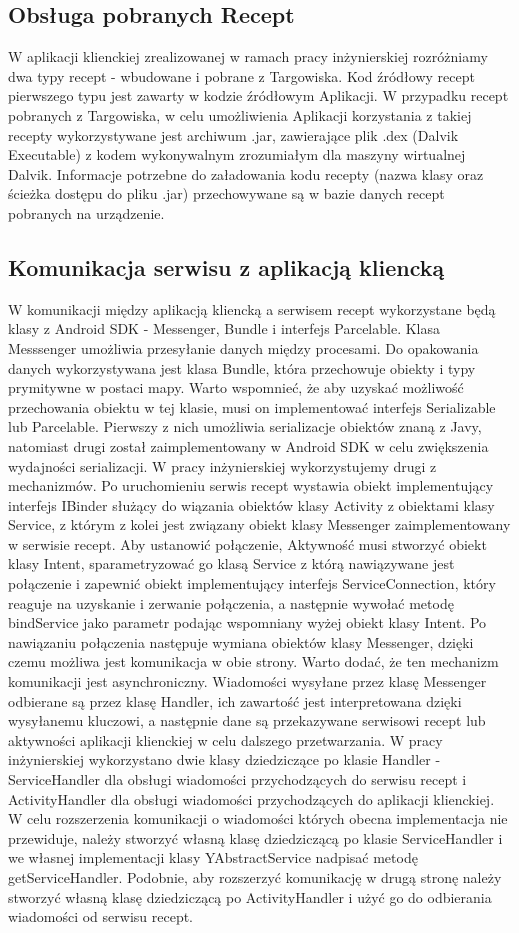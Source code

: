 \documentclass[11pt,a4paper,polish,thesis]{dcsbook}
\begin{document}
\subsection {Obsługa pobranych Recept}
W aplikacji klienckiej zrealizowanej w ramach pracy inżynierskiej rozróżniamy dwa typy recept - wbudowane i pobrane z Targowiska. Kod źródłowy recept pierwszego typu jest zawarty w kodzie źródłowym Aplikacji. W przypadku recept pobranych z Targowiska, w celu umożliwienia Aplikacji korzystania z takiej recepty wykorzystywane jest archiwum .jar, zawierające plik .dex (Dalvik Executable) z kodem wykonywalnym  zrozumiałym dla maszyny wirtualnej Dalvik. Informacje potrzebne do załadowania kodu recepty (nazwa klasy oraz ścieżka dostępu do pliku .jar) przechowywane są w bazie danych recept pobranych na urządzenie. 
\subsection{Komunikacja serwisu z aplikacją kliencką}
W komunikacji między aplikacją kliencką a serwisem recept wykorzystane będą klasy z Android SDK - Messenger, Bundle i interfejs Parcelable. Klasa Messsenger umożliwia przesyłanie danych między procesami. \cite{android.mesage} Do opakowania danych wykorzystywana jest klasa Bundle, która przechowuje obiekty i typy prymitywne w postaci mapy. Warto wspomnieć, że aby uzyskać możliwość przechowania obiektu w tej klasie, musi on implementować interfejs Serializable lub Parcelable. Pierwszy z nich umożliwia serializacje obiektów znaną z Javy, natomiast drugi został zaimplementowany w Android SDK w celu zwiększenia wydajności serializacji. W pracy inżynierskiej wykorzystujemy drugi z mechanizmów. Po uruchomieniu serwis recept wystawia obiekt implementujący interfejs IBinder służący do wiązania obiektów klasy Activity z obiektami klasy Service,  z którym z kolei jest związany obiekt klasy Messenger zaimplementowany w serwisie recept. Aby ustanowić połączenie, Aktywność musi stworzyć obiekt klasy Intent, sparametryzować go klasą Service z którą nawiązywane jest połączenie i zapewnić obiekt implementujący interfejs ServiceConnection, który reaguje na uzyskanie i zerwanie połączenia, a następnie wywołać metodę bindService jako parametr podając wspomniany wyżej obiekt klasy Intent. Po nawiązaniu połączenia następuje wymiana obiektów klasy Messenger, dzięki czemu możliwa jest komunikacja w obie strony. Warto dodać, że ten mechanizm komunikacji jest asynchroniczny. Wiadomości wysyłane przez klasę Messenger odbierane są przez klasę Handler, ich zawartość jest interpretowana dzięki wysyłanemu kluczowi, a następnie dane są przekazywane serwisowi recept lub aktywności aplikacji klienckiej w celu dalszego przetwarzania. W pracy inżynierskiej wykorzystano dwie klasy dziedziczące po klasie Handler - ServiceHandler dla obsługi wiadomości przychodzących do serwisu recept i ActivityHandler dla obsługi wiadomości przychodzących do aplikacji klienckiej. W celu rozszerzenia komunikacji o wiadomości których obecna implementacja nie przewiduje, należy stworzyć własną klasę dziedziczącą po klasie ServiceHandler i we własnej implementacji klasy YAbstractService nadpisać metodę getServiceHandler. Podobnie, aby rozszerzyć komunikację w drugą stronę należy stworzyć własną klasę dziedziczącą po ActivityHandler i użyć go do odbierania wiadomości od serwisu recept.
\end{document}
